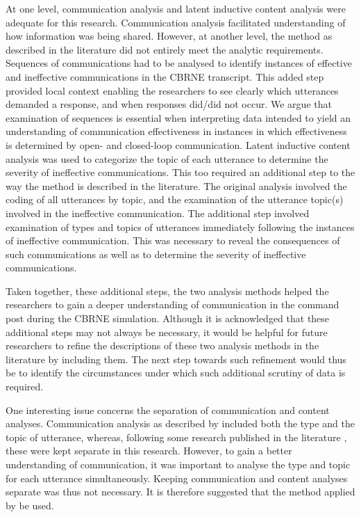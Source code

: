 \documentclass[link]{IWCOMP}
\begin{document}
 At one level, communication analysis and latent inductive content analysis
were adequate for this research. Communication analysis facilitated
understanding of how information was being shared. However, at another
level, the method as described in the literature did not entirely meet the
analytic requirements. Sequences of communications had to be analysed to
identify instances of effective and ineffective communications in the CBRNE
transcript. This added step provided local context enabling the researchers
to see clearly which utterances demanded a response, and when responses
did/did not occur. We argue that examination of sequences is essential when
interpreting data intended to yield an understanding of communication
effectiveness in instances in which effectiveness is determined by open- and
closed-loop communication. Latent inductive content analysis was used to
categorize the topic of each utterance to determine the severity of
ineffective communications. This too required an additional step to the way
the method is described in the literature. The original analysis involved
the coding of all utterances by topic, and the examination of the utterance
topic(s) involved in the ineffective communication. The additional step
involved examination of types and topics of utterances immediately following
the instances of ineffective communication. This was necessary to reveal the
consequences of such communications as well as to determine the severity of
ineffective communications.

 Taken together, these additional steps, the two analysis methods helped the
researchers to gain a deeper understanding of communication in the command
post during the CBRNE simulation. Although it is acknowledged that these
additional steps may not always be necessary, it would be helpful for future
researchers to refine the descriptions of these two analysis methods in the
literature by including them. The next step towards such refinement would
thus be to identify the circumstances under which such additional scrutiny
of data is required.

One interesting issue concerns the separation of communication and content
analyses. Communication analysis as described by \citep{bib17} included both
the type and the topic of utterance, whereas, following some research
published in the literature \citep{bib9}, these were kept
separate in this research. However, to gain a better understanding of
communication, it was important to analyse the type and topic for each
utterance simultaneously. Keeping communication and content analyses
separate was thus not necessary. It is therefore suggested that the method
applied by \citep{bib17} be used.
\end{document}
